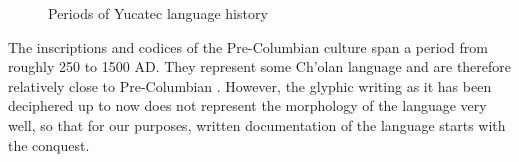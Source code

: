 \documentclass[output=paper]{langsci/langscibook}
\begin{document}
\begin{figure}
\caption{Periods of Yucatec language history}\label{fig:lehmann:2}
% 
% 
% 
\startchronology[startyear=-2500,endyear=2017,startdate=false,stopdate=false,width=.9\textwidth]
\stopchronology
\end{figure}

The inscriptions and codices of the Pre-Columbian  culture span a period from roughly 250 to 1500 AD. They represent some Ch'olan language and are therefore relatively close to Pre-Columbian . However, the glyphic writing as it has been deciphered up to now does not represent the morphology of the language very well, so that for our purposes, written documentation of the language starts with the  conquest.
\end{document}
